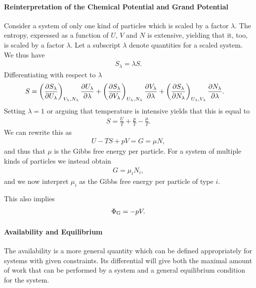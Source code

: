 \paragraph{Reinterpretation of the Chemical Potential and Grand Potential}
Consider a system of only one kind of particles which is scaled by a factor $\lambda$. The entropy, expressed as a function of $U$, $V$ and $N$ is extensive, yielding that it, too, is scaled by a factor $\lambda$. Let a subscript $\lambda$ denote quantities for a scaled system. We thus have
\begin{align*}
	S_{\lambda} = \lambda S.
\end{align*}
Differentiating with respect to $\lambda$ 
\begin{align*}
	S &= \left(\pdv{S_{\lambda}}{U_{\lambda}}\right)_{V_{\lambda}, N_{\lambda}}\pdv{U_{\lambda}}{\lambda} + \left(\pdv{S_{\lambda}}{V_{\lambda}}\right)_{U_{\lambda}, N_{\lambda}}\pdv{V_{\lambda}}{\lambda} + \left(\pdv{S_{\lambda}}{N_{\lambda}}\right)_{U_{\lambda}, V_{\lambda}}\pdv{N_{\lambda}}{\lambda}.
\end{align*}
Setting $\lambda = 1$ or arguing that temperature is intensive yields that this is equal to
\begin{align*}
	S = \frac{U}{T} + \frac{p}{T} - \frac{\mu}{T}. 
\end{align*}
We can rewrite this as
\begin{align*}
	U - TS + pV = G = \mu N,
\end{align*}
and thus that $\mu$ is the Gibbs free energy per particle. For a system of multiple kinds of particles we instead obtain
\begin{align*}
	G = \mu_{i}N_{i},
\end{align*}
and we now interpret $\mu_{i}$ as the Gibbs free energy per particle of type $i$.

This also implies
\begin{align*}
	\Phi_{\text{G}} = -pV.
\end{align*}

\paragraph{Availability and Equilibrium}
The availability is a more general quantity which can be defined appropriately for systems with given constraints. Its differential will give both the maximal amount of work that can be performed by a system and a general equilibrium condition for the system.

